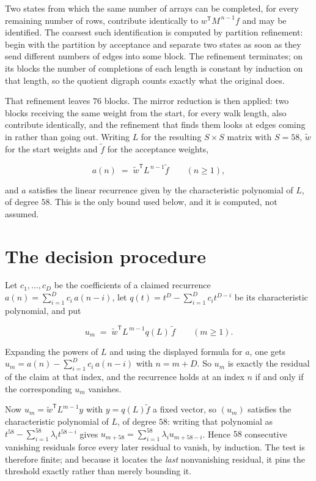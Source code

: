 \documentclass[11pt]{article}
\theoremstyle{definition}
\begin{document}
Two states from which the same number of arrays can be completed, for every remaining number of rows, contribute identically to $w^{\mathsf T}M^{\,n-1}f$ and may be identified. The coarsest such identification is computed by partition refinement: begin with the partition by acceptance and separate two states as soon as they send different numbers of edges into some block. The refinement terminates; on its blocks the number of completions of each length is constant by induction on that length, so the quotient digraph counts exactly what the original does.

That refinement leaves $76$ blocks. The mirror reduction is then applied: two blocks receiving the same weight from the start, for every walk length, also contribute identically, and the refinement that finds them looks at edges coming in rather than going out. Writing $L$ for the resulting $S \times S$ matrix with $S = 58$, $\tilde w$ for the start weights and $\tilde f$ for the acceptance weights,

\[a(n) \;=\; \tilde w^{\mathsf T} L^{\,n-1} \tilde f \qquad (n \ge 1),\]

and $a$ satisfies the linear recurrence given by the characteristic polynomial of $L$, of degree $58$. This is the only bound used below, and it is computed, not assumed.

\section{The decision procedure}

Let $c_1,\dots,c_D$ be the coefficients of a claimed recurrence $a(n) = \sum_{i=1}^{D} c_i\,a(n-i)$, let $q(t) = t^{D} - \sum_{i=1}^{D} c_i t^{D-i}$ be its characteristic polynomial, and put

\[u_m \;=\; \tilde w^{\mathsf T} L^{\,m-1} q(L)\,\tilde f \qquad (m \ge 1).\]

Expanding the powers of $L$ and using the displayed formula for $a$, one gets $u_m = a(n) - \sum_{i=1}^{D} c_i\,a(n-i)$ with $n = m + D$. So $u_m$ is exactly the residual of the claim at that index, and the recurrence holds at an index $n$ if and only if the corresponding $u_m$ vanishes.

Now $u_m = \tilde w^{\mathsf T} L^{m-1} y$ with $y = q(L)\tilde f$ a fixed vector, so $(u_m)$ satisfies the characteristic polynomial of $L$, of degree $58$: writing that polynomial as $t^{58} - \sum_{i=1}^{58} \lambda_i t^{58-i}$ gives $u_{m+58} = \sum_{i=1}^{58} \lambda_i u_{m+58-i}$. Hence $58$ consecutive vanishing residuals force every later residual to vanish, by induction. The test is therefore finite; and because it locates the {\itshape last} nonvanishing residual, it pins the threshold exactly rather than merely bounding it.
\end{document}
